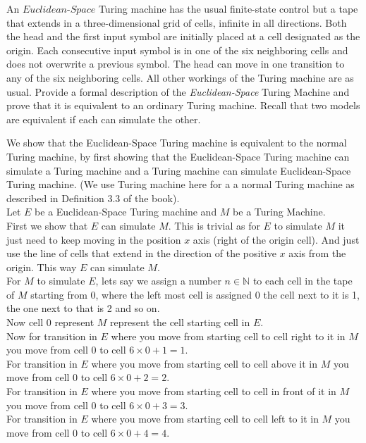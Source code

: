 \documentclass[addpoints]{exam}
\begin{document}
\begin{questions}
\question [10] An $\textit{Euclidean-Space}$ Turing machine has the usual finite-state control but a tape that extends in a three-dimensional grid of cells, infinite in all directions. Both the head and the first input symbol are initially placed at a cell designated as the origin. Each consecutive input symbol is in one of the six neighboring cells and does not overwrite a previous symbol. The head can move in one transition to any of the six neighboring cells. All other workings of the Turing machine are as usual. Provide a formal description of the \textit{Euclidean-Space} Turing Machine and prove that it is equivalent to an ordinary Turing machine. Recall that two models are equivalent if each can simulate the other.
	\begin{solution}
    We show that the Euclidean-Space Turing machine is equivalent to the normal Turing machine, by first showing that the Euclidean-Space Turing machine can simulate a Turing machine and a Turing machine can simulate Euclidean-Space Turing machine. (We use Turing machine here for a a normal Turing machine as described in Definition 3.3 of the book).
		\\Let $E$ be a Euclidean-Space Turing machine and $M$ be a Turing Machine. 
    \\First we show that $E$ can simulate $M$. This is trivial as for $E$ to simulate $M$ it just need to keep moving in the position $x$ axis (right of the origin cell). And just use the line of cells that extend in the direction of the positive $x$ axis from the origin. This way $E$ can simulate $M$.
    \\For $M$ to simulate $E$, lets say we assign a number $n \in \mathbb{N}$ to each cell in the tape of $M$ starting from 0, where the left most cell is assigned 0 the cell next to it is 1, the one next to that is 2 and so on.
    \\Now cell 0 represent $M$ represent the cell starting cell in $E$. 
    \\Now for transition in $E$ where you move from starting cell to cell right to it in $M$ you move from cell 0 to cell $6\times 0 + 1 = 1$.
    \\For transition in $E$ where you move from starting cell to cell above it in $M$ you move from cell 0 to cell $6\times 0 + 2 = 2$.
    \\For transition in $E$ where you move from starting cell to cell in front of it in $M$ you move from cell 0 to cell $6\times 0 + 3 = 3$.
    \\For transition in $E$ where you move from starting cell to cell left to it in $M$ you move from cell 0 to cell $6\times 0 + 4 = 4$.

\end{solution}
\end{questions}
\end{document}
